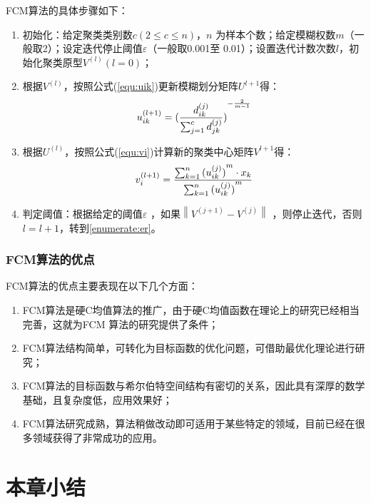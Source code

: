 FCM算法的具体步骤如下：
\begin{enumerate}[label=（\arabic*）]
	\item 初始化：给定聚类类别数$c(2\leqslant c\leqslant n)$，$n$
	为样本个数；给定模糊权数$m$（一般取2）；设定迭代停止阈值$\varepsilon$（一般取0.001至	0.01）；设置迭代计数次数$l$，初始化聚类原型$V^{(l)}(l=0)$；
	\item{\label{enumerate:er}} 根据$V^{(l)}$，按照公式(\ref{equ:uik})更新模糊划分矩阵$U^{l+1}$得：
	\begin{equation}
		u_{ik}^{(l+1)} = {({d_{ik}^{(j)}
				\over
				\sum_{j=1}^{c}d_{jk}^{(j)}
				})}^{-{2\over m-1}}
	\end{equation}
	\item 根据$U^{(l)}$，按照公式(\ref{equ:vi})计算新的聚类中心矩阵$V^{l+1}$得：
	\begin{equation}
		v_{i}^{(l+1)} = {\sum_{k=1}^{n}{(u_{ik}^{(j)})}^m\cdot x_k
				\over
				\sum_{k=1}^{n}{(u_{ik}^{(j)})}^m
			}
	\end{equation}
	\item 判定阈值：根据给定的阈值$\varepsilon$	，如果$\left\| V^{(j+1)}-V^{(j)} \right\|$ ，则停止迭代，否则$l=l+1$，转到\ref{enumerate:er}。 
\end{enumerate}

\subsubsection{FCM算法的优点}
FCM算法的优点主要表现在以下几个方面：
\begin{enumerate}[label=（\arabic*）]
	\item FCM算法是硬C均值算法的推广，由于硬C均值函数在理论上的研究已经相当完善，这就为FCM	算法的研究提供了条件；
	\item FCM算法结构简单，可转化为目标函数的优化问题，可借助最优化理论进行研究；
	\item FCM算法的目标函数与希尔伯特空间结构有密切的关系，因此具有深厚的数学基础，且复杂度低，应用效果好；
	\item FCM算法研究成熟，算法稍做改动即可适用于某些特定的领域，目前已经在很多领域获得了非常成功的应用。
\end{enumerate}

\section{本章小结}